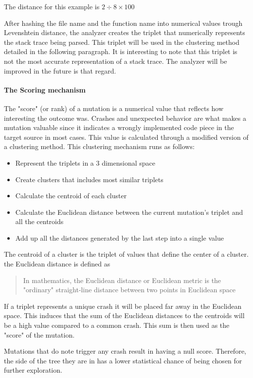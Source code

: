 \documentclass{article}
\begin{document}
\begin{empfile}
The distance for this example is $2\div8\times100$				
				
After hashing the file name and the function name into numerical values trough Levenshtein distance, the analyzer creates the triplet that numerically represents the stack trace being parsed. This triplet will be used in the clustering method detailed in the following paragraph.
It is interesting to note that this triplet is not the most accurate representation of a stack trace. The analyzer will be improved in the future is that regard.

				\paragraph{The Scoring mechanism}
The "score" (or rank) of a mutation is a numerical value that reflects how interesting the outcome was. Crashes and unexpected behavior are what makes a mutation valuable since it indicates a wrongly implemented code piece in the target source in most cases. This value is calculated through a modified version of a clustering method.
This clustering mechanism runs as follows:
	\begin{itemize}
	\item{Represent the triplets in a 3 dimensional space}
	\item{Create clusters that includes most similar triplets}
	\item{Calculate the centroid of each cluster}
	\item{Calculate the Euclidean distance between the current mutation's triplet and all the centroids}
	\item{Add up all the distances generated by the last step into a single value}
	\end{itemize}

The centroid of a cluster is the triplet of values that define the center of a cluster.
the Euclidean distance is defined as
	\begin{quotation}
	In mathematics, the Euclidean distance or Euclidean metric is the "ordinary" straight-line distance between two points in Euclidean space
	\end{quotation}
	
If a triplet represents a unique crash it will be placed far away in the Euclidean space. This induces that the sum of the Euclidean distances to the centroids will be a high value compared to a common crash. This sum is then used as the "score" of the mutation. 

Mutations that do note trigger any crash result in having a null score. Therefore, the side of the tree they are in has a lower statistical chance of being chosen for further exploration.


\end{empfile}
\end{document}
